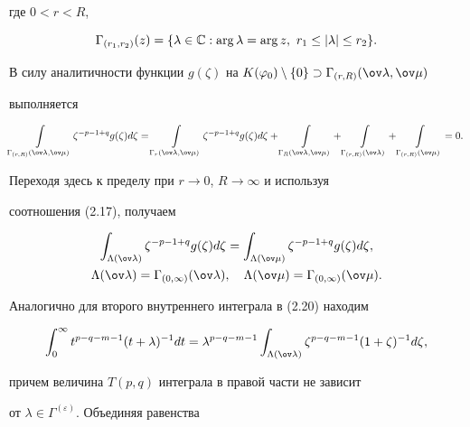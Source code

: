 где $0<r<R$,


$$


\Gamma_{(r_1,r_2)}(z)=\{\lambda\in\Bbb C:\arg\lambda=\arg z,


\ r_1\le|\lambda|\le r_2\}.


$$


В силу аналитичности функции $g(\zeta)$ на $K(\varphi_0)\setminus\{0\} 


\supset \Gamma_{(r,R)}(\ov\lambda,\ov\mu)$


выполняется


$$


\int\limits_{\Gamma_{(r,R)}(\ov\lambda,\ov\mu)}


\zeta^{-p-1+q}g(\zeta)d\zeta=\int\limits_{\Gamma_r(\ov\lambda,\ov\mu)}


\zeta^{-p-1+q}g(\zeta)d\zeta+\int\limits_{\Gamma_R(\ov\lambda,\ov\mu)}+


\int\limits_{\Gamma_{(r,R)}(\ov\lambda)}+


\int\limits_{\Gamma_{(r,R)}(\ov\mu)}=0.


$$


Переходя здесь к пределу при $r\to0$, $R\to\infty$ и используя 


соотношения (2.17), получаем


\begin{gather*}


\int_{\Lambda(\ov\lambda)}\zeta^{-p-1+q}g(\zeta)d\zeta=


\int_{\Lambda(\ov\mu)}\zeta^{-p-1+q}g(\zeta)d\zeta,\\


%


\Lambda(\ov\lambda)=\Gamma_{(0,\infty)}(\ov\lambda),\quad


\Lambda(\ov\mu)=\Gamma_{(0,\infty)}(\ov\mu).


\end{gather*}


Аналогично для второго внутреннего интеграла в (2.20) находим


\begin{equation}


\int^\infty_0 t^{p-q-m-1}(t+\lambda)^{-1}dt=\lambda^{p-q-m-1}


\int_{\Lambda(\ov\lambda)}\zeta^{p-q-m-1}(1+\zeta)^{-1}d\zeta,


\end{equation}


причем величина $T(p,q)$ интеграла в правой части не зависит 


от $\lambda\in\Gamma^{(\varepsilon)}$. Объединяя равенства 


